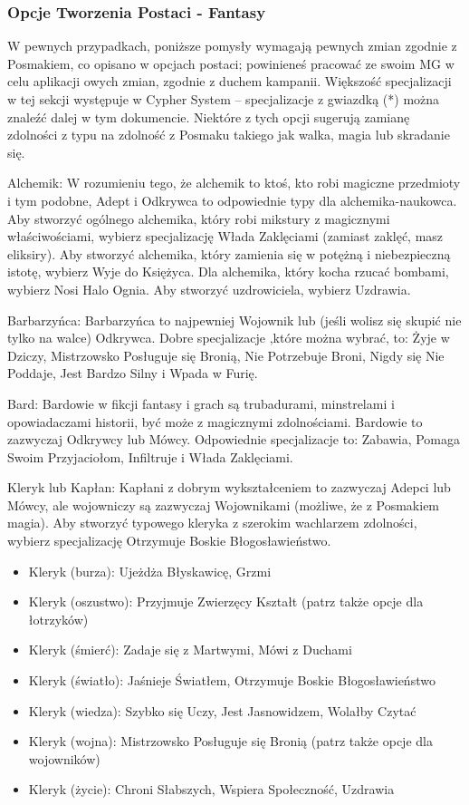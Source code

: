 \subsubsection{Opcje Tworzenia Postaci - Fantasy}

W pewnych przypadkach, poniższe pomysły wymagają pewnych zmian zgodnie z Posmakiem, co opisano w opcjach postaci; powinieneś pracować ze swoim MG w celu aplikacji owych zmian, zgodnie z duchem kampanii. Większość specjalizacji w tej sekcji występuje w Cypher System – specjalizacje z gwiazdką (*) można znaleźć dalej w tym dokumencie. Niektóre z tych opcji sugerują zamianę zdolności z typu na zdolność z Posmaku takiego jak walka, magia lub skradanie się.

Alchemik: W rozumieniu tego, że alchemik to ktoś, kto robi magiczne przedmioty i tym podobne, Adept i Odkrywca to odpowiednie typy dla alchemika-naukowca. Aby stworzyć ogólnego alchemika, który robi mikstury z magicznymi właściwościami, wybierz specjalizację Włada Zaklęciami (zamiast zaklęć, masz eliksiry). Aby stworzyć alchemika, który zamienia się w potężną i niebezpieczną istotę, wybierz Wyje do Księżyca. Dla alchemika, który kocha rzucać bombami, wybierz Nosi Halo Ognia. Aby stworzyć uzdrowiciela, wybierz Uzdrawia.

Barbarzyńca: Barbarzyńca to najpewniej Wojownik lub (jeśli wolisz się skupić nie tylko na walce) Odkrywca. Dobre specjalizacje ,które można wybrać, to: Żyje w Dziczy, Mistrzowsko Posługuje się Bronią, Nie Potrzebuje Broni, Nigdy się Nie Poddaje, Jest Bardzo Silny i Wpada w Furię. 

Bard: Bardowie w fikcji fantasy i grach są trubadurami, minstrelami i opowiadaczami historii, być może z magicznymi zdolnościami. Bardowie to zazwyczaj Odkrywcy lub Mówcy. Odpowiednie specjalizacje to: Zabawia, Pomaga Swoim Przyjaciołom, Infiltruje i Włada Zaklęciami.

Kleryk lub Kapłan: Kapłani z dobrym wykształceniem to zazwyczaj Adepci lub Mówcy, ale wojowniczy są zazwyczaj Wojownikami (możliwe, że z Posmakiem magia). Aby stworzyć typowego kleryka z szerokim wachlarzem zdolności, wybierz specjalizację Otrzymuje Boskie Błogosławieństwo.

\begin{itemize}
\item Kleryk (burza): Ujeżdża Błyskawicę, Grzmi
\item Kleryk (oszustwo): Przyjmuje Zwierzęcy Kształt (patrz także opcje dla łotrzyków) 
\item Kleryk (śmierć): Zadaje się z Martwymi, Mówi z Duchami
\item Kleryk (światło): Jaśnieje Światłem, Otrzymuje Boskie Błogosławieństwo
\item Kleryk (wiedza): Szybko się Uczy, Jest Jasnowidzem, Wolałby Czytać
\item Kleryk (wojna): Mistrzowsko Posługuje się Bronią (patrz także opcje dla wojowników)
\item Kleryk (życie): Chroni Słabszych, Wspiera Społeczność, Uzdrawia
\end{itemize}

